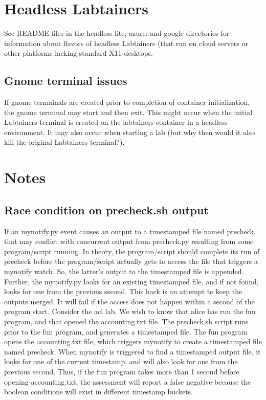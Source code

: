 \documentclass[12pt]{article}
\begin{document}
\section {Headless Labtainers}
See README files in the headless-lite; azure; and google directories for information about flavors of headless Labtainers (that run
on cloud servers or other platforms lacking standard X11 desktops.
\subsection{Gnome terminal issues}
If gnome termainals are created prior to completion of container initialization, the gnome terminal may start and then exit.  This
might occur when the initial Labtainers terminal is created on the labtainers container in a headless environment.  It may also occur
when starting a lab (but why then would it also kill the original Labtainers terminal?).

\section {Notes}
\subsection {Race condition on precheck.sh output}
If an mynotify.py event causes an output to a timestamped file named precheck, that may conflict with
concurrent output from precheck.py resulting from some program/script running.  In 
theory, the program/script should complete its run of precheck before the program/script
actually gets to access the file that triggers a mynotify watch.  So, the latter's output
to the timestamped file is appended.  Further, the mynotify.py looks for an existing timestamped
file, and if not found, looks for one from the previous second.  This hack is an attempt to
keep the outputs merged.  It will fail if the access does not happen within a second of the
program start.  Consider the acl lab.  We wish to know that alice has run the fun program,
and that opened the accounting.txt file.  The precheck.sh script runs prior to the fun program,
and generates a timestamped file.  The fun program opens the accounting.txt file, which triggers
mynotify to create a timestamped file named precheck.  When mynotify is triggered to find a timestamped
output file, it looks for one of the current timestamp, and will also look for one from the previous second.
Thus, if the fun program takes more than 1 second before opening accounting.txt, the assessment will report
a false negative because the boolean conditions will exist in different timestamp buckets.
\end{document}
